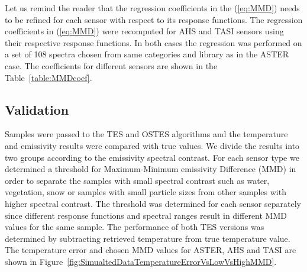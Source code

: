 Let us remind the reader that the regression coefficients in the (\ref{eq:MMD}) needs to be refined for each sensor with respect to its response functions. The regression coefficients in (\ref{eq:MMD}) were recomputed for AHS and TASI sensors using their respective response functions. In both cases the regression was performed on a set of 108 spectra chosen from same categories and library as in the ASTER case. The coefficients for different sensors are shown in the Table~\ref{table:MMDcoef}.

\subsection*{Validation}

Samples were passed to the TES and OSTES algorithms and the temperature and emissivity results were compared with true values. We divide the results into two groups according to the emissivity spectral contrast. For each sensor type we determined a threshold for Maximum-Minimum emissivity Difference (MMD) in order to separate the samples with small spectral contrast such as water, vegetation, snow or samples with small particle sizes from other samples with higher spectral contrast. The threshold was determined for each sensor separately since different response functions and spectral ranges result in different MMD values for the same sample. The performance of both TES versions was determined by subtracting retrieved temperature from true temperature value. The temperature error and chosen MMD values for ASTER, AHS and TASI are shown in Figure~\ref{fig:SimualtedDataTemperatureErrorVsLowVsHighMMD}.

